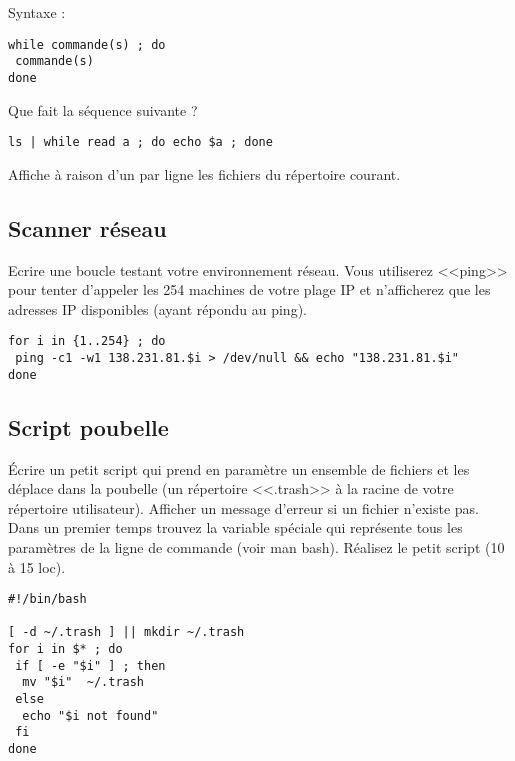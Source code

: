 \documentclass[11pt]{article}
\begin{document}
Syntaxe :

\begin{verbatim}
while commande(s) ; do
 commande(s)
done
\end{verbatim}

Que fait la séquence suivante ?

\begin{lstlisting}
ls | while read a ; do echo $a ; done
\end{lstlisting}

\begin{solution}
Affiche à raison d'un par ligne les fichiers du répertoire courant.
\end{solution}

\subsection{Scanner réseau}

Ecrire une boucle testant votre environnement réseau. Vous utiliserez <<ping>> pour tenter d'appeler les 254 machines de votre plage IP et n'afficherez que les adresses IP disponibles (ayant répondu au ping).

\begin{solution}
\begin{verbatim}
for i in {1..254} ; do
 ping -c1 -w1 138.231.81.$i > /dev/null && echo "138.231.81.$i"
done
\end{verbatim}
\end{solution}

\subsection{Script poubelle}

Écrire un petit script qui prend en paramètre un ensemble de fichiers et les déplace dans la poubelle (un répertoire <<.trash>> à la racine de votre répertoire utilisateur).
Afficher un message d'erreur si un fichier n'existe pas.
Dans un premier temps trouvez la variable spéciale qui représente tous les paramètres de la ligne de commande (voir man bash).
Réalisez le petit script (10 à 15 loc).

\begin{solution}
\begin{verbatim}
#!/bin/bash

[ -d ~/.trash ] || mkdir ~/.trash
for i in $* ; do
 if [ -e "$i" ] ; then
  mv "$i"  ~/.trash
 else
  echo "$i not found"
 fi
done
\end{verbatim}
\end{solution}
\end{document}
